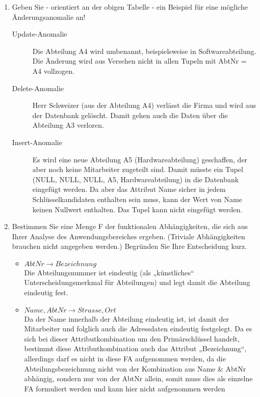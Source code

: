 \documentclass{lehramt-informatik-haupt}
\begin{document}
\renewcommand{\labelenumi}{(\alph{enumi})}
\begin{enumerate}


\item Geben Sie - orientiert an der obigen Tabelle - ein Beispiel für
eine mögliche Änderungsanomalie an!

\begin{liAntwort}
\begin{description}
\item[Update-Anomalie] Die Abteilung A4 wird umbenannt, beispielsweise
in Softwareabteilung. Die Änderung wird aus Versehen nicht in allen
Tupeln mit AbtNr = A4 vollzogen.

\item[Delete-Anomalie] Herr Schweizer (aus der Abteilung A4) verlässt
die Firma und wird aus der Datenbank gelöscht. Damit gehen auch die
Daten über die Abteilung A3 verloren.

\item[Insert-Anomalie] Es wird eine neue Abteilung A5
(Hardwareabteilung) geschaffen, der aber noch keine Mitarbeiter
zugeteilt sind. Damit müsste ein Tupel (NULL, NULL, NULL, A5,
Hardwareabteilung) in die Datenbank eingefügt werden. Da aber das
Attribut Name sicher in jedem Schlüsselkandidaten enthalten sein muss,
kann der Wert von Name keinen Nullwert enthalten. Das Tupel kann nicht
eingefügt werden.
\end{description}
\end{liAntwort}


\item Bestimmen Sie eine Menge F der funktionalen Abhängigkeiten, die
sich aus Ihrer Analyse des Anwendungsbereiches ergeben. (Triviale
Abhängigkeiten brauchen nicht angegeben werden.) Begründen Sie Ihre
Entscheidung kurz.

\begin{liAntwort}
\begin{itemize}
\item $AbtNr \rightarrow Bezeichnung$ \\
Die Abteilungsnummer ist eindeutig (als „künstliches“
Unterscheidungsmerkmal für Abteilungen) und legt damit die Abteilung
eindeutig fest.

\item $Name, AbtNr \rightarrow Strasse, Ort$ \\
Da der Name innerhalb der Abteilung eindeutig ist, ist damit der
Mitarbeiter und folglich auch die Adressdaten eindeutig festgelegt. Da
es sich bei dieser Attributkombination um den Primärschlüssel handelt,
bestimmt diese Attributkombination auch das Attribut „Bezeichnung“,
allerdings darf es nicht in diese FA aufgenommen werden, da die
Abteilungsbezeichnung nicht von der Kombination aus Name \& AbtNr
abhängig, sondern nur von der AbtNr allein, somit muss dies als
einzelne FA formuliert werden und kann hier nicht aufgenommen werden


\end{itemize}
\end{liAntwort}
\end{enumerate}
\end{document}
